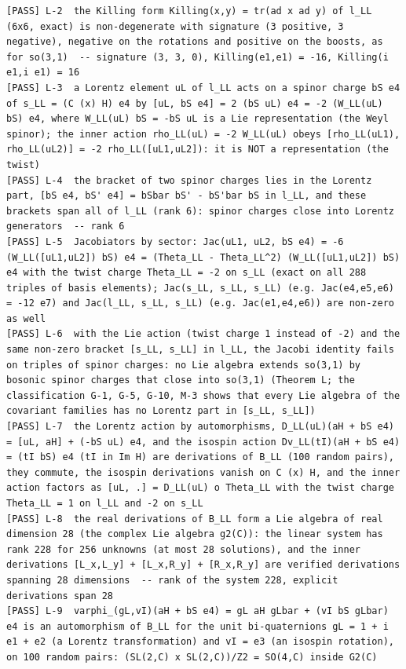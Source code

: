 \documentclass[
  10pt,
]{article}
\begin{document}
\begin{verbatim}
[PASS] L-2  the Killing form Killing(x,y) = tr(ad x ad y) of l_LL (6x6, exact) is non-degenerate with signature (3 positive, 3 negative), negative on the rotations and positive on the boosts, as for so(3,1)  -- signature (3, 3, 0), Killing(e1,e1) = -16, Killing(i e1,i e1) = 16
[PASS] L-3  a Lorentz element uL of l_LL acts on a spinor charge bS e4 of s_LL = (C (x) H) e4 by [uL, bS e4] = 2 (bS uL) e4 = -2 (W_LL(uL) bS) e4, where W_LL(uL) bS = -bS uL is a Lie representation (the Weyl spinor); the inner action rho_LL(uL) = -2 W_LL(uL) obeys [rho_LL(uL1), rho_LL(uL2)] = -2 rho_LL([uL1,uL2]): it is NOT a representation (the twist)
[PASS] L-4  the bracket of two spinor charges lies in the Lorentz part, [bS e4, bS' e4] = bSbar bS' - bS'bar bS in l_LL, and these brackets span all of l_LL (rank 6): spinor charges close into Lorentz generators  -- rank 6
[PASS] L-5  Jacobiators by sector: Jac(uL1, uL2, bS e4) = -6 (W_LL([uL1,uL2]) bS) e4 = (Theta_LL - Theta_LL^2) (W_LL([uL1,uL2]) bS) e4 with the twist charge Theta_LL = -2 on s_LL (exact on all 288 triples of basis elements); Jac(s_LL, s_LL, s_LL) (e.g. Jac(e4,e5,e6) = -12 e7) and Jac(l_LL, s_LL, s_LL) (e.g. Jac(e1,e4,e6)) are non-zero as well
[PASS] L-6  with the Lie action (twist charge 1 instead of -2) and the same non-zero bracket [s_LL, s_LL] in l_LL, the Jacobi identity fails on triples of spinor charges: no Lie algebra extends so(3,1) by bosonic spinor charges that close into so(3,1) (Theorem L; the classification G-1, G-5, G-10, M-3 shows that every Lie algebra of the covariant families has no Lorentz part in [s_LL, s_LL])
[PASS] L-7  the Lorentz action by automorphisms, D_LL(uL)(aH + bS e4) = [uL, aH] + (-bS uL) e4, and the isospin action Dv_LL(tI)(aH + bS e4) = (tI bS) e4 (tI in Im H) are derivations of B_LL (100 random pairs), they commute, the isospin derivations vanish on C (x) H, and the inner action factors as [uL, .] = D_LL(uL) o Theta_LL with the twist charge Theta_LL = 1 on l_LL and -2 on s_LL
[PASS] L-8  the real derivations of B_LL form a Lie algebra of real dimension 28 (the complex Lie algebra g2(C)): the linear system has rank 228 for 256 unknowns (at most 28 solutions), and the inner derivations [L_x,L_y] + [L_x,R_y] + [R_x,R_y] are verified derivations spanning 28 dimensions  -- rank of the system 228, explicit derivations span 28
[PASS] L-9  varphi_(gL,vI)(aH + bS e4) = gL aH gLbar + (vI bS gLbar) e4 is an automorphism of B_LL for the unit bi-quaternions gL = 1 + i e1 + e2 (a Lorentz transformation) and vI = e3 (an isospin rotation), on 100 random pairs: (SL(2,C) x SL(2,C))/Z2 = SO(4,C) inside G2(C)

\end{verbatim}
\end{document}
